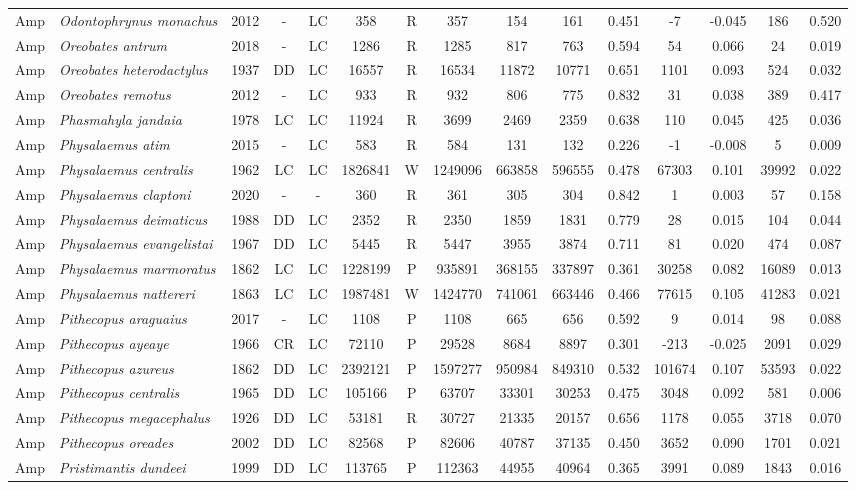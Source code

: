 \documentclass[12pt,openright,oneside,a4paper,english]{abntex2}
\begin{document}
\begin{landscape}
\begin{longtable}{llccccccccccccc}
		Amp&\textit{Odontophrynus monachus}&2012&-&LC&358&R&357&154&161&0.451&-7&-0.045&186&0.520\\
		Amp&\textit{Oreobates antrum}&2018&-&LC&1286&R&1285&817&763&0.594&54&0.066&24&0.019\\
		Amp&\textit{Oreobates heterodactylus}&1937&DD&LC&16557&R&16534&11872&10771&0.651&1101&0.093&524&0.032\\
		Amp&\textit{Oreobates remotus}&2012&-&LC&933&R&932&806&775&0.832&31&0.038&389&0.417\\
		Amp&\textit{Phasmahyla jandaia}&1978&LC&LC&11924&R&3699&2469&2359&0.638&110&0.045&425&0.036\\
		Amp&\textit{Physalaemus atim}&2015&-&LC&583&R&584&131&132&0.226&-1&-0.008&5&0.009\\
		Amp&\textit{Physalaemus centralis}&1962&LC&LC&1826841&W&1249096&663858&596555&0.478&67303&0.101&39992&0.022\\
		Amp&\textit{Physalaemus claptoni}&2020&-&-&360&R&361&305&304&0.842&1&0.003&57&0.158\\
		Amp&\textit{Physalaemus deimaticus}&1988&DD&LC&2352&R&2350&1859&1831&0.779&28&0.015&104&0.044\\
		Amp&\textit{Physalaemus evangelistai}&1967&DD&LC&5445&R&5447&3955&3874&0.711&81&0.020&474&0.087\\
		Amp&\textit{Physalaemus marmoratus}&1862&LC&LC&1228199&P&935891&368155&337897&0.361&30258&0.082&16089&0.013\\
		Amp&\textit{Physalaemus nattereri}&1863&LC&LC&1987481&W&1424770&741061&663446&0.466&77615&0.105&41283&0.021\\
		Amp&\textit{Pithecopus araguaius}&2017&-&LC&1108&P&1108&665&656&0.592&9&0.014&98&0.088\\
		Amp&\textit{Pithecopus ayeaye}&1966&CR&LC&72110&P&29528&8684&8897&0.301&-213&-0.025&2091&0.029\\
		Amp&\textit{Pithecopus azureus}&1862&DD&LC&2392121&P&1597277&950984&849310&0.532&101674&0.107&53593&0.022\\
		Amp&\textit{Pithecopus centralis}&1965&DD&LC&105166&P&63707&33301&30253&0.475&3048&0.092&581&0.006\\
		Amp&\textit{Pithecopus megacephalus}&1926&DD&LC&53181&R&30727&21335&20157&0.656&1178&0.055&3718&0.070\\
		Amp&\textit{Pithecopus oreades}&2002&DD&LC&82568&P&82606&40787&37135&0.450&3652&0.090&1701&0.021\\
		Amp&\textit{Pristimantis dundeei}&1999&DD&LC&113765&P&112363&44955&40964&0.365&3991&0.089&1843&0.016\\

\end{longtable}
\end{landscape}
\end{document}
